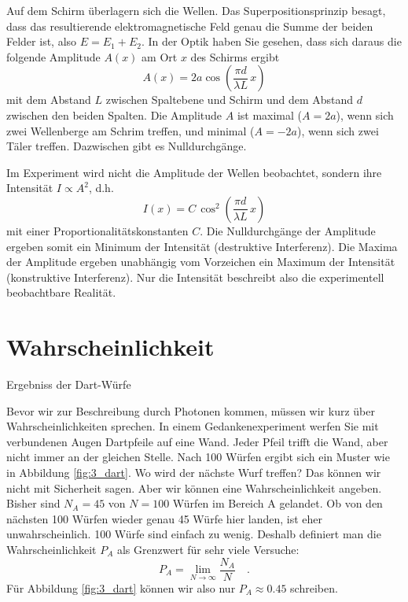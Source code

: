 Auf dem Schirm überlagern sich die Wellen. Das Superpositionsprinzip besagt, dass das resultierende elektromagnetische Feld genau die Summe der beiden Felder ist, also $E = E_1 + E_2$. In der Optik haben Sie gesehen, dass sich daraus die folgende Amplitude $A(x)$ am Ort $x$ des Schirms ergibt
\begin{equation}
    A(x) = 2 a\cos \left( \frac{\pi d}{\lambda L} \, x \right)
\end{equation}
mit dem Abstand $L$ zwischen Spaltebene und Schirm und dem Abstand $d$ zwischen den beiden Spalten. Die Amplitude $A$ ist maximal ($A = 2a$), wenn sich zwei Wellenberge am Schrim treffen, und minimal ($A = -2 a$), wenn sich zwei Täler treffen.  Dazwischen gibt es Nulldurchgänge. 

Im Experiment wird nicht die Amplitude der Wellen beobachtet, sondern ihre Intensität $I \propto A^2$, d.h.
\begin{equation}
    I(x) = C \, \cos^2 \left( \frac{\pi d}{\lambda L} \, x \right)
\end{equation}
mit einer Proportionalitätskonstanten $C$. Die Nulldurchgänge der Amplitude ergeben somit ein Minimum der Intensität (destruktive Interferenz). Die Maxima der Amplitude ergeben unabhängig vom Vorzeichen ein Maximum der Intensität (konstruktive Interferenz). Nur die Intensität beschreibt also die experimentell beobachtbare Realität.


\section{Wahrscheinlichkeit}

\begin{marginfigure}
    \caption{Ergebniss der Dart-Würfe}
    \label{fig:3_dart}
\end{marginfigure}


Bevor wir zur Beschreibung durch Photonen kommen, müssen wir kurz über Wahrscheinlichkeiten sprechen. In einem Gedankenexperiment werfen Sie mit verbundenen Augen Dartpfeile auf eine Wand. Jeder Pfeil trifft die Wand, aber nicht immer an der gleichen Stelle. Nach 100 Würfen ergibt sich ein Muster wie in Abbildung  \ref{fig:3_dart}. Wo wird der nächste Wurf treffen? Das können wir nicht mit Sicherheit sagen. Aber wir können eine Wahrscheinlichkeit angeben. Bisher sind $N_A =45$ von $N = 100$ Würfen im Bereich A gelandet. Ob von den nächsten 100 Würfen wieder genau 45 Würfe hier landen, ist eher unwahrscheinlich. 100 Würfe sind einfach zu wenig. Deshalb definiert man die Wahrscheinlichkeit $P_A$ als Grenzwert für sehr viele Versuche:
\begin{equation}
    P_A =  \lim_{N \rightarrow \infty} \frac{N_A}{N} \quad .
\end{equation}
Für Abbildung \ref{fig:3_dart} können wir also nur $P_A \approx 0.45$ schreiben. 


